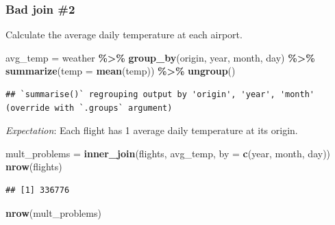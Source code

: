 \documentclass[
]{article}
\newenvironment{Shaded}{\begin{snugshade}}{\end{snugshade}}
\newcommand{\DataTypeTok}[1]{\textcolor[rgb]{0.13,0.29,0.53}{#1}}
\newcommand{\KeywordTok}[1]{\textcolor[rgb]{0.13,0.29,0.53}{\textbf{#1}}}
\newcommand{\NormalTok}[1]{#1}
\newcommand{\OperatorTok}[1]{\textcolor[rgb]{0.81,0.36,0.00}{\textbf{#1}}}
\newcommand{\StringTok}[1]{\textcolor[rgb]{0.31,0.60,0.02}{#1}}
\begin{document}
\hypertarget{bad-join-2}{%
\subsubsection{Bad join \#2}\label{bad-join-2}}

Calculate the average daily temperature at each airport.

\begin{Shaded}
\begin{Highlighting}[]
\NormalTok{avg\_temp =}\StringTok{ }\NormalTok{weather }\OperatorTok{\%\textgreater{}\%}\StringTok{ }
\StringTok{    }\KeywordTok{group\_by}\NormalTok{(origin, year, month, day) }\OperatorTok{\%\textgreater{}\%}\StringTok{ }
\StringTok{    }\KeywordTok{summarize}\NormalTok{(}\DataTypeTok{temp =} \KeywordTok{mean}\NormalTok{(temp)) }\OperatorTok{\%\textgreater{}\%}\StringTok{ }
\StringTok{    }\KeywordTok{ungroup}\NormalTok{()}
\end{Highlighting}
\end{Shaded}

\begin{verbatim}
## `summarise()` regrouping output by 'origin', 'year', 'month' (override with `.groups` argument)
\end{verbatim}

\emph{Expectation}: Each flight has 1 average daily temperature at its origin.

\begin{Shaded}
\begin{Highlighting}[]
\NormalTok{mult\_problems =}\StringTok{ }\KeywordTok{inner\_join}\NormalTok{(flights, avg\_temp, }
                           \DataTypeTok{by =} \KeywordTok{c}\NormalTok{(}\StringTok{\textquotesingle{}year\textquotesingle{}}\NormalTok{, }\StringTok{\textquotesingle{}month\textquotesingle{}}\NormalTok{, }\StringTok{\textquotesingle{}day\textquotesingle{}}\NormalTok{))}
\KeywordTok{nrow}\NormalTok{(flights)}
\end{Highlighting}
\end{Shaded}

\begin{verbatim}
## [1] 336776
\end{verbatim}

\begin{Shaded}
\begin{Highlighting}[]
\KeywordTok{nrow}\NormalTok{(mult\_problems)}
\end{Highlighting}
\end{Shaded}
\end{document}
